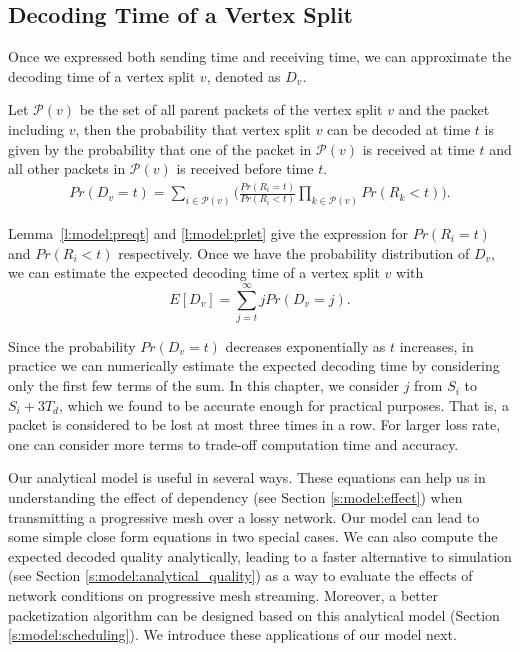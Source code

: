 \subsection{Decoding Time of a Vertex Split}

    Once we expressed both sending time and receiving time,
    we can approximate the decoding time of a vertex split $v$, denoted
    as $D_v$.

    Let $\mathcal{P}(v)$ be the set of
    all parent packets of the vertex split $v$ and the packet including $v$, then the
    probability that vertex split $v$ can be decoded at time $t$
    is given by the probability that one of the packet in $\mathcal{P}(v)$
    is received at time $t$ and all other packets in $\mathcal{P}(v)$
    is received before time $t$.
    \begin{eqnarray}
    \label{e:model:pdvt}
        Pr(D_v = t) = \sum_{i \in \mathcal{P}(v)}\big( \frac{Pr(R_i = t)}{Pr(R_i < t)} \prod_{k \in \mathcal{P}(v)} Pr(R_k < t)\big).
    \end{eqnarray}

    Lemma~\ref{l:model:preqt} and \ref{l:model:prlet} give the expression
    for $Pr(R_i=t)$ and $Pr(R_i<t)$ respectively.
    Once we have the probability distribution of $D_v$, we can
    estimate the expected decoding time of a vertex split $v$
    with
    \begin{equation}
    \label{e:model:e_et}
        E[D_v] = \sum_{j=t}^{\infty}jPr(D_v = j).
    \end{equation}

    Since the probability $Pr(D_v = t)$ decreases exponentially
    as $t$ increases, in practice we can numerically estimate the
    expected decoding time by considering only the first few
    terms of the sum.  In this chapter, we consider $j$ from $S_i$ to $S_i + 3T_d$,
    which we found to be accurate enough for practical purposes.
    That is,
    a packet is considered to be lost at most three times in a row.
    For larger loss rate, one can consider more terms to trade-off
    computation time and accuracy.


    Our analytical model is useful in several ways.  
    These equations can help us in understanding the effect of dependency (see Section \ref{s:model:effect}) when transmitting 
    a progressive mesh over a lossy network.  Our model can lead to some simple close form equations in two special cases.  
    We can also compute the expected decoded quality analytically, leading to a faster alternative to 
    simulation (see Section \ref{s:model:analytical_quality}) as a way to evaluate the effects of network conditions on
    progressive mesh streaming.
    Moreover, a better packetization algorithm can be designed based on this analytical model (Section \ref{s:model:scheduling}). 
    We introduce these applications of our model next.


